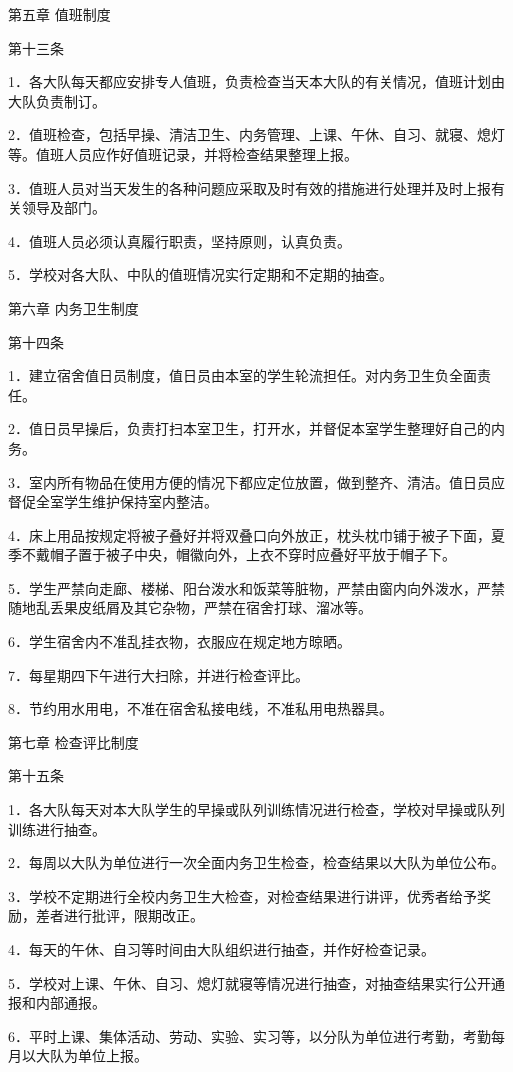 \documentclass[UTF8,12pt,a4paper]{report}
\begin{document}
第五章 值班制度

第十三条

1．各大队每天都应安排专人值班，负责检查当天本大队的有关情况，值班计划由大队负责制订。

2．值班检查，包括早操、清洁卫生、内务管理、上课、午休、自习、就寝、熄灯等。值班人员应作好值班记录，并将检查结果整理上报。

3．值班人员对当天发生的各种问题应采取及时有效的措施进行处理并及时上报有关领导及部门。

4．值班人员必须认真履行职责，坚持原则，认真负责。

5．学校对各大队、中队的值班情况实行定期和不定期的抽查。

第六章 内务卫生制度

第十四条

1．建立宿舍值日员制度，值日员由本室的学生轮流担任。对内务卫生负全面责任。

2．值日员早操后，负责打扫本室卫生，打开水，并督促本室学生整理好自己的内务。

3．室内所有物品在使用方便的情况下都应定位放置，做到整齐、清洁。值日员应督促全室学生维护保持室内整洁。

4．床上用品按规定将被子叠好并将双叠口向外放正，枕头枕巾铺于被子下面，夏季不戴帽子置于被子中央，帽徽向外，上衣不穿时应叠好平放于帽子下。

5．学生严禁向走廊、楼梯、阳台泼水和饭菜等脏物，严禁由窗内向外泼水，严禁随地乱丢果皮纸屑及其它杂物，严禁在宿舍打球、溜冰等。

6．学生宿舍内不准乱挂衣物，衣服应在规定地方晾晒。

7．每星期四下午进行大扫除，并进行检查评比。

8．节约用水用电，不准在宿舍私接电线，不准私用电热器具。

第七章 检查评比制度

第十五条

1．各大队每天对本大队学生的早操或队列训练情况进行检查，学校对早操或队列训练进行抽查。

2．每周以大队为单位进行一次全面内务卫生检查，检查结果以大队为单位公布。

3．学校不定期进行全校内务卫生大检查，对检查结果进行讲评，优秀者给予奖励，差者进行批评，限期改正。

4．每天的午休、自习等时间由大队组织进行抽查，并作好检查记录。

5．学校对上课、午休、自习、熄灯就寝等情况进行抽查，对抽查结果实行公开通报和内部通报。

6．平时上课、集体活动、劳动、实验、实习等，以分队为单位进行考勤，考勤每月以大队为单位上报。
\end{document}
